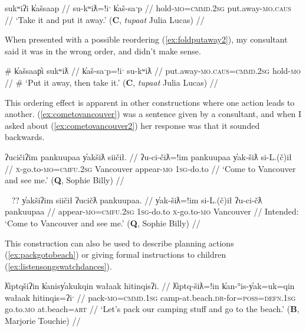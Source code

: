 \ex \label{ex:foldputaway1}
\begingl
\glpreamble sukʷiʔi k̓ašsaap //
\gla su-kʷiƛ=!iˑ k̓aš-saˑp //
\glb hold-\textsc{mo}=\textsc{cmmd.2sg} put.away-\textsc{mo.caus} //
\glft `Take it and put it away.' (\textbf{C}, \textit{tupaat} Julia Lucas) //
\endgl
\xe

When presented with a possible reordering (\ref{ex:foldputaway2}), my consultant said it was in the wrong order, and didn't make sense.

\ex \label{ex:foldputaway2}
\begingl
\glpreamble \# k̓ašsaap̓i sukʷiƛ //
\gla k̓aš-saˑp=!iˑ su-kʷiƛ //
\glb put.away-\textsc{mo.caus}=\textsc{cmmd.2sg} hold-\textsc{mo} //
\glft \# `Put it away, then take it.' (\textbf{C}, \textit{tupaat} Julia Lucas) //
\endgl
\xe

This ordering effect is apparent in other constructions where one action leads to another. (\ref{ex:cometovancouver}) was a sentence given by a consultant, and when I asked about (\ref{ex:cometovancouver2}) her response was that it sounded backwards.

\ex \label{ex:cometovancouver}
\begingl
\glpreamble ʔucičiʔim pankuupaa y̓akšiƛ siičił. //
\gla ʔu-ci-čiƛ=!im pankuupaa y̓ak-šiƛ si-L.(č)ił //
\glb \textsc{x}-go.to-\textsc{mo}=\textsc{cmfu.2sg} Vancouver appear-\textsc{mo} \textsc{1sg}-do.to //
\glft `Come to Vancouver and see me.' (\textbf{Q}, Sophie Billy) //
\endgl
\xe

\ex~ \label{ex:cometovancouver2}
\begingl
\glpreamble ?? y̓akšiʔim siičił ʔucičƛ pankuupaa. //
\gla y̓ak-šiƛ=!im si-L.(č)ił ʔu-ci-čƛ pankuupaa //
\glb appear-\textsc{mo}=\textsc{cmfu.2sg} \textsc{1sg}-do.to \textsc{x}-go.to-\textsc{mo} Vancouver //
\glft Intended: `Come to Vancouver and see me.' (\textbf{Q}, Sophie Billy) //
\endgl
\xe

This construction can also be used to describe planning actions (\ref{ex:packgotobeach}) or giving formal instructions to children (\ref{ex:listensongswatchdances}).

\ex \label{ex:packgotobeach}
\begingl
\glpreamble ƛ̓iptqšiʔin k̓anisy̓akukqin wałaak hitinqisʔi. //
\gla ƛ̓iptq-šiƛ=!in k̓an-°is-y̓ak=uk=qin wałaak hitinqis=ʔiˑ //
\glb pack-\textsc{mo}=\textsc{cmmd.1sg} camp-at.beach.\textsc{dr}-for=\textsc{poss}=\textsc{defn.1sg} go.to.\textsc{mo} at.beach=\textsc{art} //
\glft `Let's pack our camping stuff and go to the beach.' (\textbf{B}, Marjorie Touchie) //
\endgl
\xe


